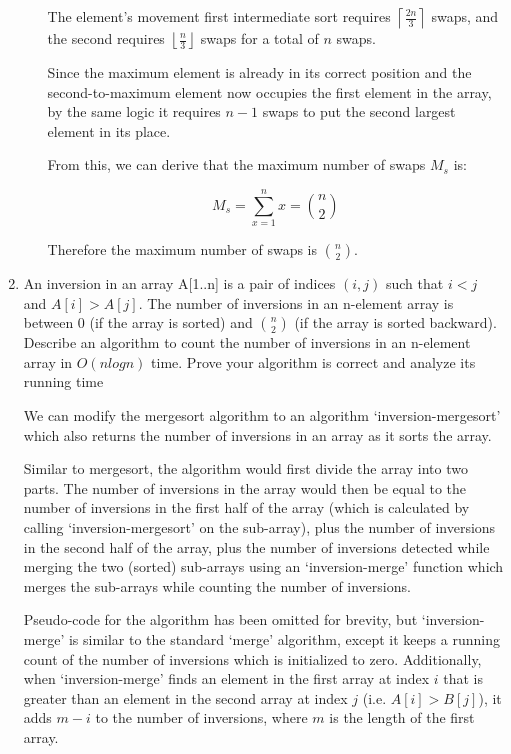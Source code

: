 \documentclass{article}
\newcommand{\ceil}[1]{\left\lceil#1\right\rceil}
\newcommand{\floor}[1]{\left\lfloor#1\right\rfloor}
\newcommand{\question}[1]{\bgroup\color{blue}#1\egroup}
\begin{document}
\begin{enumerate}
\begin{enumerate}
      The element's movement first intermediate sort requires $\ceil{\frac{2n}{3}}$ swaps, and the second requires $\floor{\frac{n}{3}}$ swaps for a total of $n$ swaps.

      Since the maximum element is already in its correct position and the second-to-maximum element now occupies the first element in the array, by the same logic it requires $n-1$ swaps to put the second largest element in its place.

      From this, we can derive that the maximum number of swaps $M_s$ is:

      $$
      M_s = \sum_{x=1}^n{x} = {n \choose 2}
      $$

      Therefore the maximum number of swaps is $n \choose 2$.


    \end{enumerate}

\item 
  \question{An inversion in an array A[1..n] is a pair of indices $(i, j)$ such that $i < j$ and
$A[i] > A[j]$. The number of inversions in an n-element array is between 0 (if the array is sorted)
and $n \choose 2$ (if the array is sorted backward). Describe an algorithm to count the number of inversions
in an n-element array in $O(n log n)$ time. Prove your algorithm is correct and analyze its running
time
}


We can modify the mergesort algorithm to an algorithm `inversion-mergesort' which also returns the number of inversions in an array as it sorts the array.

Similar to mergesort, the algorithm would first divide the array into two parts. 
The number of inversions in the array would then be equal to the number of inversions in the first half of the array (which is calculated by calling `inversion-mergesort' on the sub-array), plus the number of inversions in the second half of the array, plus the number of inversions detected while merging the two (sorted) sub-arrays using an `inversion-merge' function which merges the sub-arrays while counting the number of inversions.

Pseudo-code for the algorithm has been omitted for brevity, but `inversion-merge' is similar to the standard `merge' algorithm, except it keeps a running count of the number of inversions which is initialized to zero. 
Additionally, when `inversion-merge' finds an element in the first array at index $i$ that is greater than an element in the second array at index $j$ (i.e. $A[i] > B[j]$), it adds $m-i$ to the number of inversions, where $m$ is the length of the first array.


\end{enumerate}
\end{document}
